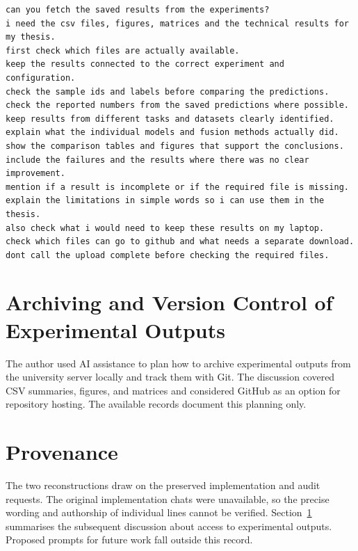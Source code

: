 \begingroup\singlespacing\footnotesize
\begin{verbatim}
can you fetch the saved results from the experiments?
i need the csv files, figures, matrices and the technical results for my thesis.
first check which files are actually available.
keep the results connected to the correct experiment and configuration.
check the sample ids and labels before comparing the predictions.
check the reported numbers from the saved predictions where possible.
keep results from different tasks and datasets clearly identified.
explain what the individual models and fusion methods actually did.
show the comparison tables and figures that support the conclusions.
include the failures and the results where there was no clear improvement.
mention if a result is incomplete or if the required file is missing.
explain the limitations in simple words so i can use them in the thesis.
also check what i would need to keep these results on my laptop.
check which files can go to github and what needs a separate download.
dont call the upload complete before checking the required files.
\end{verbatim}
\endgroup

\section{Archiving and Version Control of Experimental Outputs}
\label{sec:results-archiving}
The author used AI assistance to plan how to archive experimental outputs from the university server locally and track them with Git. The discussion covered CSV summaries, figures, and matrices and considered GitHub as an option for repository hosting. The available records document this planning only.

\section{Provenance}
The two reconstructions draw on the preserved implementation and audit requests. The original implementation chats were unavailable, so the precise wording and authorship of individual lines cannot be verified. Section~\ref{sec:results-archiving} summarises the subsequent discussion about access to experimental outputs. Proposed prompts for future work fall outside this record.
